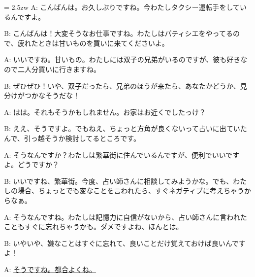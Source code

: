 \documentclass[11pt]{amsart}
\title{}
\author{}
\newenvironment{hangall}[1]{\hangindent = 2.5zw\everypar{\hangindent = 2.5zw}}{}
\begin{document}
\maketitle
\begin{hangall}{}%
A: こんばんは。お久しぶりですね。今わたしタクシー運転手をしているんですよ。

B: こんばんは！大変そうなお仕事ですね。わたしはパティシエをやってるので、疲れたときは甘いものを買いに来てくださいよ。

A: いいですね。甘いもの。わたしには双子の兄弟がいるのですが、彼も好きなので二人分買いに行きますね。

B: ぜひぜひ！いや、双子だったら、兄弟のほうが来たら、あなたかどうか、見分けがつかなそうだな！

A: はは。それもそうかもしれません。お家はお近くでしたっけ？

B: ええ、そうですよ。でもねえ、ちょっと方角が良くないって占いに出ていたんで、引っ越そうか検討してるところです。

A: そうなんですか？わたしは繁華街に住んでいるんですが、便利でいいですよ。どうですか？

B: いいですね、繁華街。今度、占い師さんに相談してみようかな。でも、わたしの場合、ちょっとでも変なことを言われたら、すぐネガティブに考えちゃうからなぁ。

A: そうなんですね。わたしは記憶力に自信がないから、占い師さんに言われたこともすぐに忘れちゃうかも。ダメですよね、ほんとは。

B: いやいや、嫌なことはすぐに忘れて、良いことだけ覚えておけば良いんですよ！

A: \ul{そうですね。都合よくね。}\end{hangall}
\end{document}
